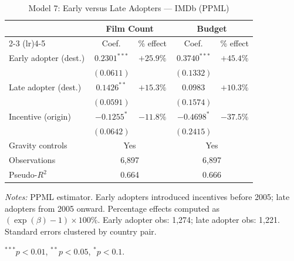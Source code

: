 \begin{table}[htbp]
\centering
\caption{Model 7: Early versus Late Adopters --- IMDb (PPML)}
\label{tab:model7}
\small
\begin{tabular}{l cc cc}
\toprule
 & \multicolumn{2}{c}{Film Count} & \multicolumn{2}{c}{Budget} \\
\cmidrule(lr){2-3} \cmidrule(lr){4-5}
 & Coef. & \% effect & Coef. & \% effect \\
\midrule
Early adopter (dest.) & $0.2301^{***}$ & $+25.9\%$ & $0.3740^{***}$ & $+45.4\%$ \\
 & $(0.0611)$ & & $(0.1332)$ & \\[4pt]
Late adopter (dest.) & $0.1426^{**}$ & $+15.3\%$ & $0.0983$ & $+10.3\%$ \\
 & $(0.0591)$ & & $(0.1574)$ & \\[4pt]
Incentive (origin) & $-0.1255^{*}$ & $-11.8\%$ & $-0.4698^{*}$ & $-37.5\%$ \\
 & $(0.0642)$ & & $(0.2415)$ & \\[4pt]
\midrule
Gravity controls & \multicolumn{2}{c}{Yes} & \multicolumn{2}{c}{Yes} \\
Observations & \multicolumn{2}{c}{6,897} & \multicolumn{2}{c}{6,897} \\
Pseudo-$R^2$ & \multicolumn{2}{c}{0.664} & \multicolumn{2}{c}{0.666} \\
\bottomrule
\end{tabular}
\par\vspace{4pt}\noindent\begin{minipage}{\textwidth}
\footnotesize
\par \textit{Notes:} PPML estimator. Early adopters introduced incentives before 2005; late adopters from 2005 onward. Percentage effects computed as $(\exp(\beta)-1) \times 100\%$. Early adopter obs: 1,274; late adopter obs: 1,221. Standard errors clustered by country pair.
\par $^{***}p<0.01$, $^{**}p<0.05$, $^{*}p<0.1$.
\end{minipage}
\end{table}

\clearpage


